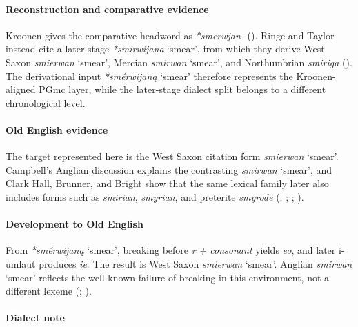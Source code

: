 \documentclass[
  british,
  a4paper,
]{article}
\providecommand{\Recon}[1]{\emph{*#1}}
\begin{document}
\paragraph{Reconstruction and comparative
evidence}\label{reconstruction-and-comparative-evidence-51}

Kroonen gives the comparative headword as \emph{*smerwjan-}
(). Ringe and Taylor instead
cite a later-stage \Recon{smirwijana} `smear', from which they derive
West Saxon {\emph{smierwan}} `smear', Mercian {\emph{smirwan}} `smear',
and Northumbrian \emph{smiriga} (). The derivational input \Recon{smérwijaną} `smear'
therefore represents the Kroonen-aligned PGmc layer, while the
later-stage dialect split belongs to a different chronological level.

\paragraph{Old English evidence}\label{old-english-evidence-51}

The target represented here is the West Saxon citation form
{\emph{smierwan}} `smear'. Campbell's Anglian discussion explains the
contrasting {\emph{smirwan}} `smear', and Clark Hall, Brunner, and
Bright show that the same lexical family later also includes forms such
as \emph{smirian}, \emph{smyrian}, and preterite \emph{smyrode}
(;
;
;
).

\paragraph{Development to Old
English}\label{development-to-old-english-51}

From \Recon{smérwijaną} `smear', breaking before \emph{r + consonant}
yields \emph{eo}, and later i-umlaut produces \emph{ie}. The result is
West Saxon {\emph{smierwan}} `smear'. Anglian {\emph{smirwan}} `smear'
reflects the well-known failure of breaking in this environment, not a
different lexeme (;
).

\paragraph{Dialect note}\label{dialect-note-5}
\end{document}
